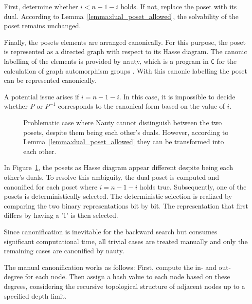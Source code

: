 \documentclass[10pt,journal,compsoc]{IEEEtran}
\begin{document}
First, determine whether $i < n - 1 - i$ holds.
If not, replace the poset with its dual.
According to Lemma~\ref{lemma:dual_poset_allowed}, the solvability of the poset remains unchanged.

Finally, the posets elements are arranged canonically.
For this purpose, the poset is represented as a directed graph with respect to its Hasse diagram.
The canonic labelling of the elements is provided by nauty, which is a program in \texttt{C} for the calculation of graph automorphism groups \cite[Practical Graph Isomorphism]{MCKAY201494}.
With this canonic labelling the poset can be represented canonically.

A potential issue arises if $i = n - 1 - i$.
In this case, it is impossible to decide whether $P$ or $P^{-1}$ corresponds to the canonical form based on the value of $i$.

\begin{figure}[!b]
  \centering
  
  \caption{Problematic case where Nauty cannot distinguish between the two posets, despite them being each other's duals. However, according to Lemma~\ref{lemma:dual_poset_allowed} they can be transformed into each other.}
  \label{fig:backward_canonify_problematic}
\end{figure}

In Figure~\ref{fig:backward_canonify_problematic}, the posets as Hasse diagram appear different despite being each other's duals.
To resolve this ambiguity, the dual poset is computed and canonified for each poset where $i = n - 1 - i$ holds true.
Subsequently, one of the posets is deterministically selected.
The deterministic selection is realized by comparing the two binary representations bit by bit.
The representation that first differs by having a '1' is then selected.

Since canonification is inevitable for the backward search but consumes significant computational time, all trivial cases are treated manually and only the remaining cases are canonified by nauty.

The manual canonification works as follows:
First, compute the in- and out-degree for each node.
Then assign a hash value to each node based on these degrees, considering the recursive topological structure of adjacent nodes up to a specified depth limit.
\end{document}
